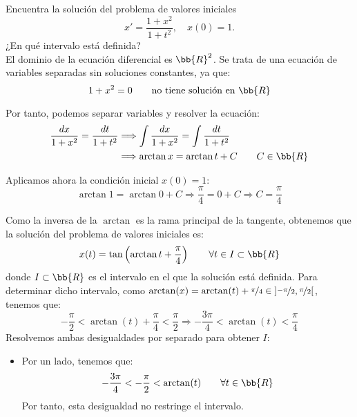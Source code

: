 \documentclass[12pt]{article}
\begin{document}
    \begin{ejercicio}
        Encuentra la solución del problema de valores iniciales
        \begin{equation*}
            x' = \dfrac{1 + x^2}{1 + t^2}, \quad x(0) = 1.
        \end{equation*}
        ¿En qué intervalo está definida?\\

        El dominio de la ecuación diferencial es $\bb{R}^2$.
        Se trata de una ecuación de variables separadas sin soluciones constantes, ya que:
        \begin{equation*}
            1+x^2=0\qquad \text{no tiene solución en }\bb{R}
        \end{equation*}

        Por tanto, podemos separar variables y resolver la ecuación:
        \begin{align*}
            \dfrac{dx}{1+x^2}=\dfrac{dt}{1+t^2}
            &\Longrightarrow \int\dfrac{dx}{1+x^2}=\int\dfrac{dt}{1+t^2}\\
            &\Longrightarrow \arctan x=\arctan t+C\qquad C\in\bb{R}
        \end{align*}

        Aplicamos ahora la condición inicial $x(0)=1$:
        \begin{equation*}
            \arctan 1=\arctan 0+C\Longrightarrow \dfrac{\pi}{4}=0+C
            \Longrightarrow C=\dfrac{\pi}{4}
        \end{equation*}

        Como la inversa de la $\arctan$ es la rama principal de la tangente, obtenemos que la solución del problema de valores iniciales es:
        \begin{equation*}
            x(t)=\tan\left(\arctan t+\dfrac{\pi}{4}\right)\qquad \forall t\in I\subset \bb{R}
        \end{equation*}
        donde $I\subset \bb{R}$ es el intervalo en el que la solución está definida. Para determinar dicho intervalo, como $\arctan(x)=\arctan(t)+\nicefrac{\pi}{4}\in \left]\nicefrac{-\pi}{2},\nicefrac{\pi}{2}\right[$, tenemos que:
        \begin{equation*}
            -\dfrac{\pi}{2}<\arctan(t)+\dfrac{\pi}{4}<\dfrac{\pi}{2}\Longrightarrow -\dfrac{3\pi}{4}<\arctan(t)<\dfrac{\pi}{4}
        \end{equation*}
        Resolvemos ambas desigualdades por separado para obtener $I$:
        \begin{itemize}
            \item Por un lado, tenemos que:
            \begin{equation*}
                -\dfrac{3\pi}{4}<-\dfrac{\pi}{2}<\arctan(t)\qquad \forall t\in \bb{R}
            \end{equation*}
            Por tanto, esta desigualdad no restringe el intervalo.


\end{itemize}
\end{ejercicio}
\end{document}
